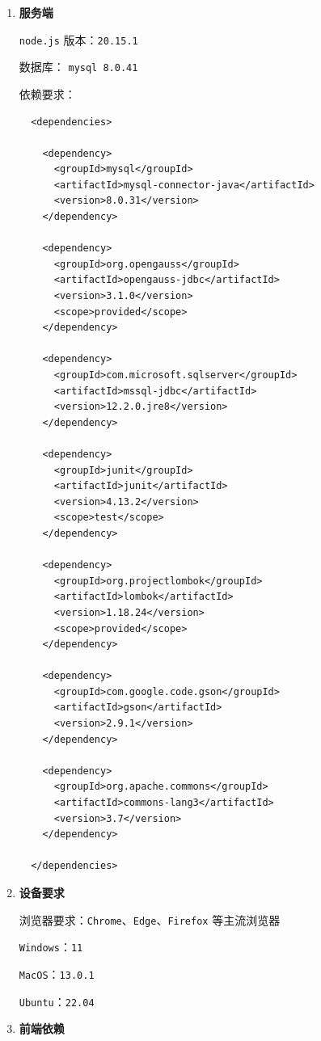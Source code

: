 \documentclass[12pt,a4paper,UTF8]{article}
\begin{document}
\begin{enumerate}
  \item \textbf{服务端}
  
  \verb|node.js| 版本：\verb|20.15.1|

  数据库： \verb|mysql 8.0.41|

  依赖要求： 

  \vspace{0.25cm} %

  \begin{lstlisting}
  <dependencies>

    <dependency>
      <groupId>mysql</groupId>
      <artifactId>mysql-connector-java</artifactId>
      <version>8.0.31</version>
    </dependency>

    <dependency>
      <groupId>org.opengauss</groupId>
      <artifactId>opengauss-jdbc</artifactId>
      <version>3.1.0</version>
      <scope>provided</scope>
    </dependency>

    <dependency>
      <groupId>com.microsoft.sqlserver</groupId>
      <artifactId>mssql-jdbc</artifactId>
      <version>12.2.0.jre8</version>
    </dependency>

    <dependency>
      <groupId>junit</groupId>
      <artifactId>junit</artifactId>
      <version>4.13.2</version>
      <scope>test</scope>
    </dependency>

    <dependency>
      <groupId>org.projectlombok</groupId>
      <artifactId>lombok</artifactId>
      <version>1.18.24</version>
      <scope>provided</scope>
    </dependency>

    <dependency>
      <groupId>com.google.code.gson</groupId>
      <artifactId>gson</artifactId>
      <version>2.9.1</version>
    </dependency>

    <dependency>
      <groupId>org.apache.commons</groupId>
      <artifactId>commons-lang3</artifactId>
      <version>3.7</version>
    </dependency>

  </dependencies>
  \end{lstlisting}
  \item \textbf{设备要求}
  
  浏览器要求：\verb|Chrome|、\verb|Edge|、\verb|Firefox| 等主流浏览器

  \verb|Windows|：\verb|11|

  \verb|MacOS|：\verb|13.0.1|

  \verb|Ubuntu|：\verb|22.04|
  \item \textbf{前端依赖}
  

\end{enumerate}
\end{document}
